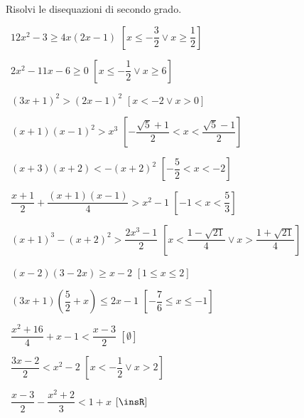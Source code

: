 % 
% 
% 

\begin{esercizio}[\Ast]
 \label{ese:4.17}
Risolvi le disequazioni di secondo grado.
\vspace{\dy}
 \begin{enumeratea}
 \item~\(12x^2-3\ge 4x(2x-1)\) 
  \hfill \(\left[x\le -\dfrac 3 2\vee x\ge \dfrac 1 2\right]\)
 \item~\(2x^2-11x-6\ge 0\) 
  \hfill \(\left[x\le -\dfrac 1 2\vee x\ge 6\right]\)
 \item~\((3x+1)^2>(2x-1)^2\) 
  \hfill \(\left[x<-2\vee x>0\right]\)
 \item~\((x+1)(x-1)^2>x^3\) 
  \hfill \(\left[-\dfrac{\sqrt 5+1} 2<x<\dfrac{\sqrt 5-1} 2\right]\)
 \item~\((x+3)(x+2)<-(x+2)^2\)
  \hfill \(\left[-\dfrac 5 2<x<-2\right]\)
 \item~\(\dfrac{x+1} 2+\dfrac{(x+1)(x-1)} 4>x^2-1\)
  \hfill \(\left[-1<x<\dfrac 5 3\right]\)
 \item~\((x+1)^3-(x+2)^2>\dfrac{2x^3-1} 2\)
  \hfill \(\left[x<\dfrac{1-\sqrt{21}} 4\vee x>\dfrac{1+\sqrt{21}} 4\right]\)
 \item~\((x-2)(3-2x)\ge x-2\)
  \hfill \(\left[1\le x\le 2\right]\)
 \item~\((3x+1)\left(\dfrac 5 2+x\right)\le 2x-1\)
  \hfill \(\left[-\dfrac 7 6\le x\le -1\right]\)
 \item~\(\dfrac{x^2+16} 4+x-1<\dfrac{x-3} 2\)
  \hfill \(\left[\emptyset\right]\)
 \item~\(\dfrac{3x-2} 2<x^2-2\)
  \hfill \(\left[x<-\dfrac 1 2\vee x>2\right]\)
 \item~\(\dfrac{x-3} 2-\dfrac{x^2+2} 3<1+x\)
  \hfill \(\left[\insR\right]\)
 \end{enumeratea}
\end{esercizio}

